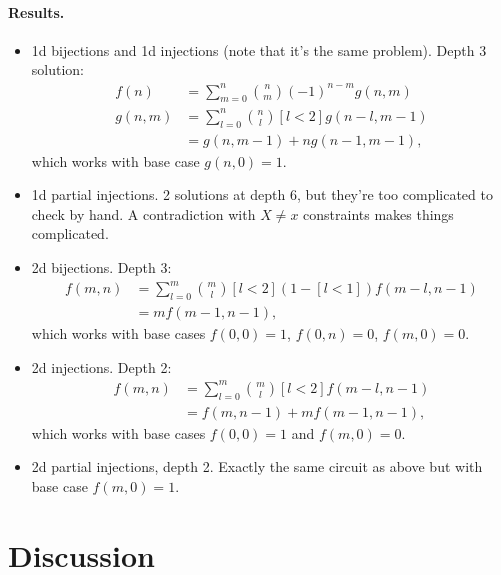 \documentclass{article}
\theoremstyle{definition}
\theoremstyle{remark}
\begin{document}
\paragraph{Results.}
\begin{itemize}
\item 1d bijections and 1d injections (note that it's the same problem). Depth 3 solution:
  \begin{align*}
    f(n) &= \sum_{m=0}^n \binom{n}{m} (-1)^{n-m}g(n, m) \\
    g(n, m) &= \sum_{l=0}^n \binom{n}{l}[l < 2]g(n-l, m-1) \\
    &= g(n, m - 1) + ng(n - 1, m - 1),
  \end{align*}
  which works with base case $g(n, 0) = 1$.
\item 1d partial injections. 2 solutions at depth 6, but they're too complicated to check by hand. A contradiction with $X \ne x$ constraints makes things complicated.
\item 2d bijections. Depth 3:
  \begin{align*}
    f(m, n) &= \sum_{l=0}^m \binom{m}{l} [l < 2] (1 - [l < 1])f(m-l, n-1) \\
    &= mf(m-1, n-1),
  \end{align*}
  which works with base cases $f(0, 0) = 1$, $f(0, n) = 0$, $f(m, 0) = 0$.
\item 2d injections. Depth 2:
  \begin{align*}
    f(m, n) &= \sum_{l=0}^m \binom{m}{l}[l<2]f(m-l, n-1) \\
    &= f(m, n-1) + mf(m-1, n-1),
  \end{align*}
  which works with base cases $f(0, 0) = 1$ and $f(m, 0) = 0$.
\item 2d partial injections, depth 2. Exactly the same circuit as above but with base case $f(m, 0) = 1$.
\end{itemize}

\section{Discussion}
\end{document}
